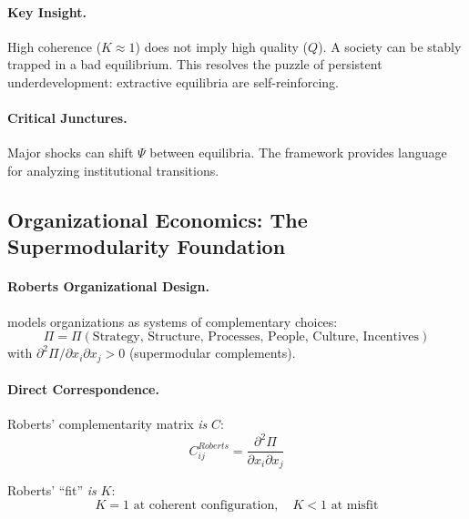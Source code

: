 \paragraph{Key Insight.}
High coherence ($K \approx 1$) does not imply high quality ($Q$).
A society can be stably trapped in a bad equilibrium.
This resolves the puzzle of persistent underdevelopment:
extractive equilibria are self-reinforcing.

\paragraph{Critical Junctures.}
Major shocks can shift $\Psi$ between equilibria.
The framework provides language for analyzing institutional transitions.

\subsection{Organizational Economics: The Supermodularity Foundation}

\paragraph{Roberts Organizational Design.}
\citet{roberts2004} models organizations as systems of complementary choices:
\begin{equation}
  \Pi = \Pi(\text{Strategy, Structure, Processes, People, Culture, Incentives})
\end{equation}
with $\partial^2 \Pi / \partial x_i \partial x_j > 0$ (supermodular complements).

\paragraph{Direct Correspondence.}
Roberts' complementarity matrix \emph{is} $C$:
\begin{equation}
  C^{Roberts}_{ij} = \frac{\partial^2 \Pi}{\partial x_i \partial x_j}
\end{equation}

Roberts' ``fit'' \emph{is} $K$:
\begin{equation}
  K = 1 \text{ at coherent configuration}, \quad K < 1 \text{ at misfit}
\end{equation}

